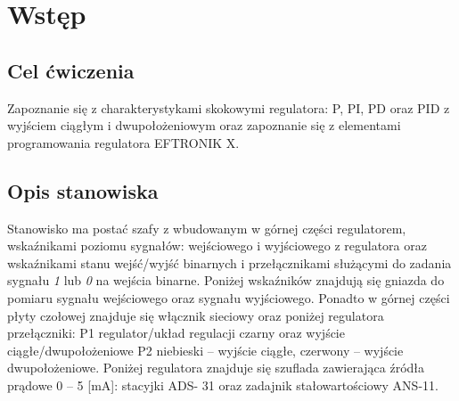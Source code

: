 \documentclass[12pt]{article}
\begin{document}


\section{Wstęp}

\subsection{Cel ćwiczenia}

Zapoznanie się z charakterystykami skokowymi regulatora: P, PI, PD oraz PID z wyjściem 
ciągłym i dwupołożeniowym oraz zapoznanie się z elementami programowania regulatora 
EFTRONIK X.

\subsection{Opis stanowiska} 

Stanowisko ma postać szafy z wbudowanym w górnej części regulatorem, wskaźnikami
poziomu sygnałów: wejściowego i wyjściowego z regulatora oraz wskaźnikami stanu wejść/wyjść 
binarnych i przełącznikami służącymi do zadania sygnału \textit{1} lub
\textit{0} na wejścia binarne. Poniżej wskaźników znajdują się gniazda do
pomiaru sygnału wejściowego oraz sygnału wyjściowego. Ponadto w górnej części płyty czołowej
znajduje się włącznik sieciowy oraz poniżej regulatora przełączniki: P1
regulator/układ regulacji czarny oraz wyjście ciągłe/dwupołożeniowe P2
niebieski – wyjście ciągłe, czerwony – wyjście dwupołożeniowe.
Poniżej regulatora znajduje się szuflada zawierająca źródła prądowe 0 – 5 [mA]: stacyjki ADS-
31 oraz zadajnik stałowartościowy ANS-11.
\end{document}
